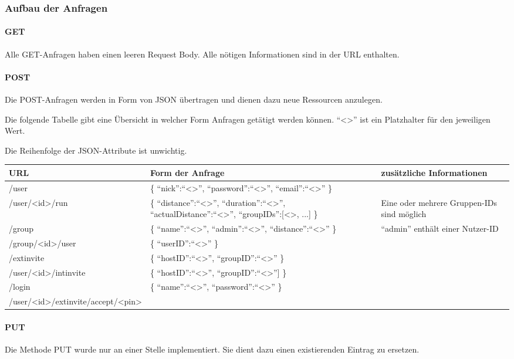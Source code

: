 \subsubsection{Aufbau der Anfragen}
\paragraph{GET}
Alle GET-Anfragen haben einen leeren Request Body. Alle nötigen Informationen sind in der URL enthalten.

\paragraph{POST}
Die POST-Anfragen werden in Form von JSON übertragen und dienen dazu neue Ressourcen anzulegen. 

Die folgende Tabelle gibt eine Übersicht in welcher Form Anfragen getätigt werden können. ``<>'' ist ein Platzhalter für den jeweiligen Wert.

Die Reihenfolge der JSON-Attribute ist unwichtig.

\begin{center}
\begin{longtable}{| p{4.1cm} | p{5cm} | p{3cm} |}
\hline
URL & Form der Anfrage & zusätzliche Informationen \\
\hline \hline
/user & \{ ``nick'':``<>'', ``password'':``<>'', ``email'':``<>'' \} & \\
\hline
/user/<id>/run & \{ ``distance'':``<>'', ``duration'':``<>'', ``actualDistance'':``<>'', ``groupIDs'':[<>, ...] \} & Eine oder mehrere Gruppen-IDs sind möglich\\
\hline
/group & \{ ``name'':``<>'', ``admin'':``<>'', ``distance'':``<>'' \} & ``admin'' enthält einer Nutzer-ID \\
\hline
/group/<id>/user & \{ ``userID'':``<>'' \} & \\
\hline
/extinvite & \{ ``hostID'':``<>'', ``groupID'':``<>'' \} & \\
\hline
/user/<id>/intinvite & \{ ``hostID'':``<>'', ``groupID'':``<>''] \} & \\
\hline
/login & \{ ``name'':``<>'', ``password'':``<>'' \} & \\
\hline
/user/<id>/extinvite/\-accept/<pin> & & \\
\hline
\end{longtable}
\end{center}
\paragraph{PUT}
Die Methode PUT wurde nur an einer Stelle implementiert. Sie dient dazu einen existierenden Eintrag zu ersetzen.

